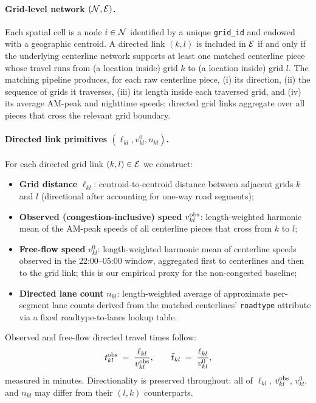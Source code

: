 \paragraph{Grid-level network $(\mathcal N,\mathcal E)$.}
Each spatial cell is a node $i\in\mathcal N$ identified by a unique
\texttt{grid\_id} and endowed with a geographic centroid.
A directed link $(k,l)$ is included in $\mathcal E$ if and only if the
underlying centerline network supports at least one matched
centerline piece whose travel runs from (a location inside) grid $k$
to (a location inside) grid $l$.  The matching pipeline produces, for
each raw centerline piece, (i) its direction, (ii) the sequence of
grids it traverses, (iii) its length inside each traversed grid, and
(iv) its average AM-peak and nighttime speeds; directed grid links
aggregate over all pieces that cross the relevant grid boundary.

\paragraph{Directed link primitives $(\ell_{kl},v^{0}_{kl},n_{kl})$.}
For each directed grid link $(k,l)\in\mathcal E$ we construct:
\begin{itemize}[leftmargin=2em,itemsep=0.2em]
  \item \textbf{Grid distance} $\ell_{kl}$: centroid-to-centroid
        distance between adjacent grids $k$ and $l$
        (directional after accounting for one-way road segments);
  \item \textbf{Observed (congestion-inclusive) speed}
        $v_{kl}^{\mathrm{obs}}$: length-weighted harmonic mean of the AM-peak
        speeds of all centerline pieces that cross from $k$ to $l$;
  \item \textbf{Free-flow speed} $v_{kl}^{0}$: length-weighted
        harmonic mean of centerline speeds observed in the
        22:00--05:00 window, aggregated first to centerlines and then
        to the grid link; this is our empirical proxy for the
        non-congested baseline;
  \item \textbf{Directed lane count} $n_{kl}$: length-weighted
        average of approximate per-segment lane counts derived from
        the matched centerlines' \texttt{roadtype} attribute via a
        fixed roadtype-to-lanes lookup table.
\end{itemize}
Observed and free-flow directed travel times follow:
\begin{equation}\label{eq:data_tkl}
  t_{kl}^{\mathrm{obs}}\;=\;\frac{\ell_{kl}}{v_{kl}^{\mathrm{obs}}},
  \qquad
  \bar t_{kl}\;=\;\frac{\ell_{kl}}{v_{kl}^{0}},
\end{equation}
measured in minutes.  Directionality is preserved throughout: all of
$\ell_{kl}$, $v_{kl}^{\mathrm{obs}}$, $v_{kl}^{0}$, and $n_{kl}$ may differ
from their $(l,k)$ counterparts.

